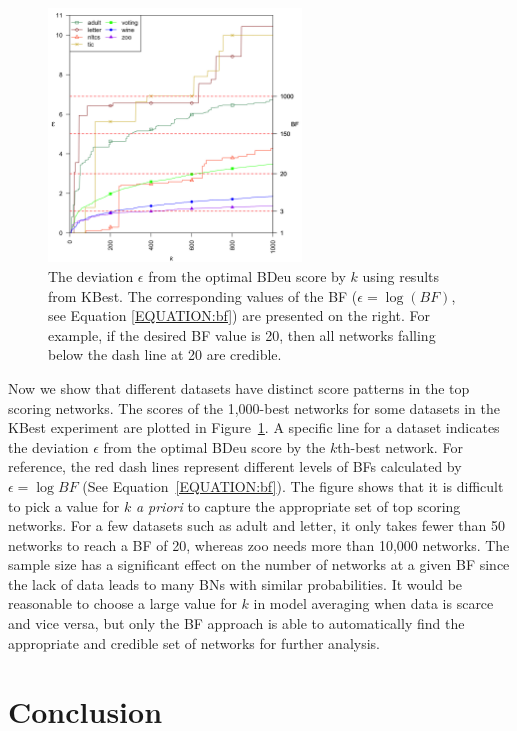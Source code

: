 \documentclass[letterpaper]{article}
\begin{document}
\vspace{-3.84mm}
\begin{figure}[thb]
\centering
\includegraphics[width=0.8\linewidth,height=2.65in ]{plot_diff.png}
\caption{The deviation $\epsilon$ from the optimal BDeu score by $k$ using results from KBest. The corresponding values of the BF ($\epsilon=\log(BF)$, see Equation \ref{EQUATION:bf}) are presented on the right. For example, if the desired BF value is 20, then all networks falling below the dash line at 20 are credible.}\label{fig:diff}
\end{figure}

Now we show that different datasets have distinct score patterns in the top scoring networks. The scores of the 1,000-best networks for some datasets in the KBest experiment are plotted in Figure~\ref{fig:diff}. A specific line for a dataset indicates the deviation $\epsilon$ from the optimal BDeu score by the $k$th-best network. For reference, the red dash lines represent different levels of BFs calculated by $\epsilon=\log{BF}$ (See Equation~\ref{EQUATION:bf}). The figure shows that it is difficult to pick a value for $k$ \emph{a priori} to capture the appropriate set of top scoring networks. For a few datasets such as adult and letter, it only takes fewer than 50 networks to reach a BF of 20, whereas zoo needs more than 10,000 networks. The sample size has a significant effect on the number of networks at a given BF since the lack of data leads to many BNs with similar probabilities. It would be reasonable to choose a large value for $k$ in model averaging when data is scarce and vice versa, but only the BF approach is able to automatically find the appropriate and credible set of networks for further analysis.

\vspace{-2.26mm}
\section{Conclusion}\label{sec:conclusion}
\end{document}
